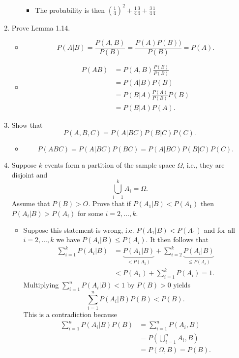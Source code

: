 \documentclass{article}
\begin{document}
\begin{enumerate}
\begin{enumerate}
\begin{itemize}
					\item The probability is then $\left(\frac{1}{4}\right)^2 + \frac{1}{4} \frac{3}{4} + \frac{3}{4}\frac{1}{4}$
				\end{itemize}
		\end{enumerate}
	\item Prove Lemma 1.14.
		\begin{itemize}
			\item
			$$
			P(A|B) = \frac{P(A, B)}{P(B)} = \frac{P(A)P(B))}{P(B)} = P(A).
			$$
			\item
			$$
			\begin{aligned}
			P(AB) &= P(A, B) \frac{P(B)}{P(B)} \\
			&= P(A|B) P(B) \\
			& = P(B|A) \frac{P(A)}{P(B)} P(B) \\
			&= P(B|A)P(A).
			\end{aligned}
			$$
		\end{itemize}
	\item Show that
	$$
	P(A, B, C) = P(A|BC)P(B|C)P(C).
	$$
		\begin{itemize}
			\item
			$$
			P(ABC) = P(A|BC)P(BC) = P(A|BC)P(B|C)P(C).
			$$
		\end{itemize}
	\item Suppose $k$ events form a partition of the sample space $\Omega$, i.e., they are disjoint and 
	$$
	\bigcup_{i = 1}^k A_i = \Omega.
	$$
	Assume that $P(B) > O$. Prove that if $P(A_1|B) < P(A_1)$ then $P(A_i|B) > P(A_i)$ for some $i = 2, \dots, k$.
		\begin{itemize}
			\item Suppose this statement is wrong, i.e. $P(A_1|B) < P(A_1)$ and for all $i = 2, \dots, k$ we have $P(A_i|B) \leq P(A_i)$. It then follows that
			$$
			\begin{aligned}
			\sum_{i = 1}^k P(A_i|B) &= \underbrace{P(A_1|B)}_{< P(A_1)} + \sum_{i = 2}^k \underbrace{P(A_i|B)}_{\leq P(A_i)} \\
			&< P(A_1) + \sum_{i = 1}^k P(A_i) = 1.
			\end{aligned}
			$$
			Multiplying $\sum_{i = 1}^n P(A_i|B) < 1$ by $P(B) > 0$ yields
			$$
			\sum_{i = 1}^n P(A_i|B)P(B) < P(B).
			$$
			This is a contradiction because
			$$
			\begin{aligned}
			\sum_{i = 1}^n P(A_i|B)P(B) &= \sum_{i = 1}^n P(A_i, B) \\
			&= P\left(\bigcup_{i = 1}^n A_i , B\right) \\
			&= P(\Omega, B) = P(B).

\end{aligned}$$
\end{itemize}
\end{enumerate}
\end{document}
